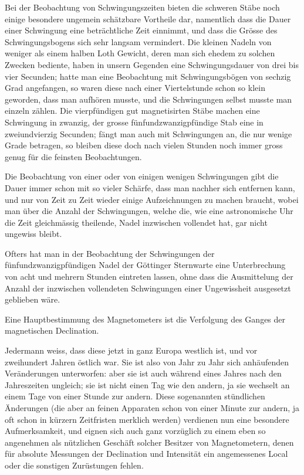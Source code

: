 \documentclass[12pt,a4paper]{article}
\begin{document}
Bei der Beobachtung von Schwingungszeiten bieten die schweren Stäbe noch einige besondere ungemein schätzbare Vortheile dar, namentlich dass die Dauer einer Schwingung eine beträchtliche Zeit einnimmt, und dass die Grösse des Schwingungsbogens sich sehr langsam vermindert. Die kleinen Nadeln von weniger als einem halben Loth Gewicht, deren man sich ehedem zu solchen Zwecken bediente, haben in unsern Gegenden eine Schwingungsdauer von drei bis vier Secunden; hatte man eine Beobachtung mit Schwingungsbögen von sechzig Grad angefangen, so waren diese nach einer Viertelstunde schon so klein geworden, dass man aufhören musste, und die Schwingungen selbst musste man einzeln zählen. Die vierpfündigen gut magnetisirten Stäbe machen eine Schwingung in zwanzig, der grosse fünfundzwanzigpfündige Stab eine in zweiundvierzig Secunden; fängt man auch mit Schwingungen an, die nur wenige Grade betragen, so bleiben diese doch nach vielen Stunden noch immer gross genug für die feinsten Beobachtungen.

Die Beobachtung von einer oder von einigen wenigen Schwingungen gibt die Dauer immer schon mit so vieler Schärfe, dass man nachher sich entfernen kann, und nur von Zeit zu Zeit wieder einige Aufzeichnungen zu machen braucht, wobei man über die Anzahl der Schwingungen, welche die, wie eine astronomische Uhr die Zeit gleichmässig theilende, Nadel inzwischen vollendet hat, gar nicht ungewiss bleibt.

Ofters hat man in der Beobachtung der Schwingungen der fünfundzwanzigpfündigen Nadel der Göttinger Sternwarte eine Unterbrechung von acht und mehrern Stunden eintreten lassen, ohne dass die Ausmittelung der Anzahl der inzwischen vollendeten Schwingungen einer Ungewissheit ausgesetzt geblieben wäre.

\bigskip

Eine Hauptbestimmung des Magnetometers ist die Verfolgung des Ganges der magnetischen Declination.

Jedermann weiss, dass diese jetzt in ganz Europa westlich ist, und vor zweihundert Jahren östlich war. Sie ist also von Jahr zu Jahr sich anhäufenden Veränderungen unterworfen: aber sie ist auch während eines Jahres nach den Jahreszeiten ungleich; sie ist nicht einen Tag wie den andern, ja sie wechselt an einem Tage von einer Stunde zur andern. Diese sogenannten stündlichen Änderungen (die aber an feinen Apparaten schon von einer Minute zur andern, ja oft schon in kürzern Zeitfristen merklich werden) verdienen nun eine besondere Aufmerksamkeit, und eignen sich auch ganz vorzüglich zu einem eben so angenehmen als nützlichen Geschäft solcher Besitzer von Magnetometern, denen für absolute Messungen der Declination und Intensität ein angemessenes Local oder die sonstigen Zurüstungen fehlen.
\end{document}
